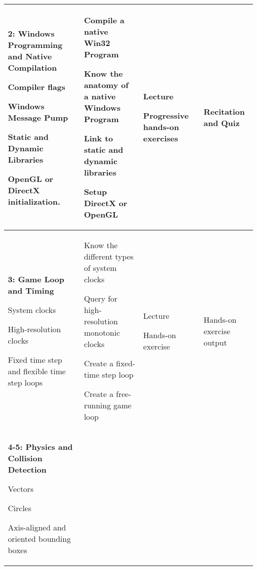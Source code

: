 \documentclass[10pt]{article}
\newenvironment{itemize*}{
\begin{itemize}[leftmargin=1em,noitemsep,nolistsep]
}{\end{itemize}}
\begin{document}
\begin{longtable}{||p{1.8in}|p{2.4in}|p{1.3in}|p{1in}||}
\textbf{2: Windows Programming and Native Compilation} 
	\begin{itemize*}
	 \item Compiler flags
	 \item Windows Message Pump
	 \item Static and Dynamic Libraries
	 \item OpenGL or DirectX initialization.
	\end{itemize*} &
	\begin{itemize*}
		\item Compile a native Win32 Program
		\item Know the anatomy of a native Windows Program
		\item Link to static and dynamic libraries
		\item Setup DirectX or OpenGL
	\end{itemize*} &
	\begin{itemize*}
		\item Lecture
		\item Progressive hands-on exercises
	\end{itemize*} & Recitation and Quiz\\ \hline
\textbf{3: Game Loop and Timing}
	\begin{itemize*}
		\item System clocks
		\item High-resolution clocks
		\item Fixed time step and flexible time step loops
	\end{itemize*} &
	\begin{itemize*}
		\item Know the different types of system clocks
		\item Query for high-resolution monotonic clocks
		\item Create a fixed-time step loop
		\item Create a free-running game loop
	\end{itemize*} &
	\begin{itemize*}
		\item Lecture
		\item Hands-on exercise
	\end{itemize*} & Hands-on exercise output \\ \hline
\textbf{4-5: Physics and Collision Detection} 
	\begin{itemize*}
		\item Vectors
		\item Circles
		\item Axis-aligned and oriented bounding boxes

\end{itemize*}
\end{longtable}
\end{document}
